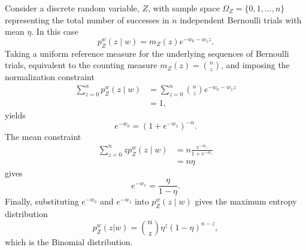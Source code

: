 \begin{example}
	Consider a discrete random variable, $Z$, with sample space $\Omega_Z = \{0,1,\dots,n\}$ representing the total number of successes in $n$ independent Bernoulli trials with mean $\eta$. In this case
	\begin{equation}
		p_{Z}^w(z \mid w) = m_Z(z) e^{-w_0 - w_1 z}.
	\end{equation}
	Taking a uniform reference measure for the underlying sequences of Bernoulli trials, equivalent to the counting measure $m_Z(z) = \binom{n}{z}$, and imposing the normalization constraint
	\begin{equation}
		\begin{split}
			\sum_{z=0}^n p_{Z}^w(z \mid w) &= \sum_{z=0}^n \binom{n}{z} e^{-w_0 - w_1 z}\\
			& = 1,
		\end{split}
	\end{equation}
	yields
	\begin{equation}
		e^{-w_0} = (1 + e^{-w_1})^{-n}.
	\end{equation}
	The mean constraint
	\begin{equation}
		\begin{split}
			\sum_{z=0}^n z p_{Z}^w(z \mid w) &= n \frac{e^{-w_1}}{1 + e^{-w_1}}\\
			& = n\eta
		\end{split}
	\end{equation}
	gives
	\begin{equation}
		e^{-w_1} = \frac{\eta}{1-\eta}.
	\end{equation}
	Finally, substituting $e^{-w_0}$ and $e^{-w_1}$ into $p_{Z}^w(z \mid w)$ gives the maximum entropy distribution
	\begin{equation}
		p_{Z}^w(z|w) = \binom{n}{z} \eta^z (1-\eta)^{n-z},
	\end{equation}
	which is the Binomial distribution.
\end{example}


